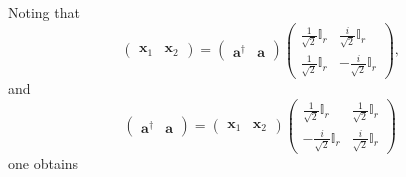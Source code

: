 \documentclass[aps, preprint]{revtex4}
\begin{document}
Noting that
\begin{equation}\left (\begin{array}{cc}\mathbf{x}_{1} & \mathbf{x}_{2}\end{array}\right ) =\left (\begin{array}{cc}\mathbf{a}^{ \dag } & \mathbf{a}\end{array}\right ) \left (\begin{array}{cc}\frac{1}{\sqrt{2}} \mathbb{I}_{r} & \frac{i}{\sqrt{2}} \mathbb{I}_{r} \\
\frac{1}{\sqrt{2}} \mathbb{I}_{r} &  -\frac{i}{\sqrt{2}} \mathbb{I}_{r}\end{array}\right )\text{,}
\end{equation}and
\begin{equation}\left (\begin{array}{cc}\mathbf{a}^{ \dag } & \mathbf{a}\end{array}\right ) =\left (\begin{array}{cc}\mathbf{x}_{1} & \mathbf{x}_{2}\end{array}\right ) \left (\begin{array}{cc}\frac{1}{\sqrt{2}} \mathbb{I}_{r} & \frac{1}{\sqrt{2}} \mathbb{I}_{r} \\
 -\frac{i}{\sqrt{2}} \mathbb{I}_{r} & \frac{i}{\sqrt{2}} \mathbb{I}_{r}\end{array}\right )
\end{equation}one obtains 
\end{document}

